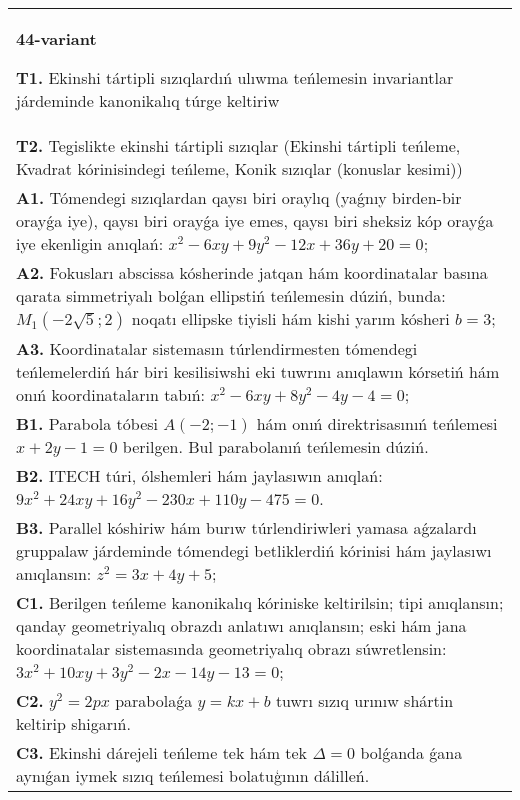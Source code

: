 \documentclass{article}
\begin{document}
\begin{tabular}{m{17cm}}
\textbf{44-variant}
\newline

\textbf{T1.} Ekinshi tártipli sızıqlardıń ulıwma teńlemesin invariantlar járdeminde kanonikalıq túrge keltiriw \\
\textbf{T2.} Tegislikte ekinshi tártipli sızıqlar (Ekinshi tártipli teńleme, Kvadrat kórinisindegi teńleme, Konik sızıqlar (konuslar kesimi)) \\
\textbf{A1.} Tómendegi sızıqlardan qaysı biri oraylıq (yaǵnıy birden-bir orayǵa iye), qaysı biri orayǵa iye emes, qaysı biri sheksiz kóp orayǵa iye ekenligin anıqlań: $x^2-6 x y+9 y^2-12 x+36 y+20=0$; \\
\textbf{A2.} Fokusları abscissa kósherinde jatqan hám koordinatalar basına qarata simmetriyalı bolǵan ellipstiń teńlemesin dúziń, bunda: $M_1 (-2 \sqrt{5}; 2) $ noqatı ellipske tiyisli hám kishi yarım kósheri $b=3$; \\
\textbf{A3.} Koordinatalar sistemasın túrlendirmesten tómendegi teńlemelerdiń hár biri kesilisiwshi eki tuwrını anıqlawın kórsetiń hám onıń koordinataların tabıń: $x^2-6 x y+8 y^2-4 y-4=0$; \\
\textbf{B1.} Parabola tóbesi $A (-2;-1) $ hám onıń direktrisasınıń teńlemesi $x+2y-1=0$ berilgen. Bul parabolanıń teńlemesin dúziń. \\
\textbf{B2.} ITECH túri, ólshemleri hám jaylasıwın anıqlań: $9 x^2+24 x y+16 y^2-230 x+110 y-475=0$. \\
\textbf{B3.} Parallel kóshiriw hám burıw túrlendiriwleri yamasa aǵzalardı gruppalaw járdeminde tómendegi betliklerdiń kórinisi hám jaylasıwı anıqlansın: $z^2=3 x+4 y+5$; \\
\textbf{C1.} Berilgen teńleme kanonikalıq kóriniske keltirilsin; tipi anıqlansın; qanday geometriyalıq obrazdı anlatıwı anıqlansın; eski hám jana koordinatalar sistemasında geometriyalıq obrazı súwretlensin: $3 x^2+10 x y+3 y^2-2 x-14 y-13=0$; \\
\textbf{C2.} $y^2=2 p x$ parabolaǵa $y=k x+b$ tuwrı sızıq urınıw shártin keltirip shigarıń. \\
\textbf{C3.} Ekinshi dárejeli teńleme tek hám tek $\Delta=0$ bolǵanda ǵana aynıǵan iymek sızıq teńlemesi bolatuģının dálilleń. \\

\end{tabular}
\vspace{1cm}
\end{document}
